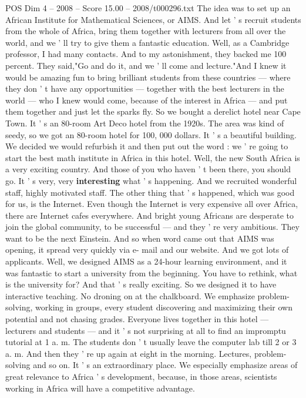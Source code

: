 \begin{textsample}{POS Dim 4 – 2008 – Score 15.00 – 2008/t000296.txt}
The idea was to set up an African Institute for Mathematical Sciences, or AIMS.
And let ' s recruit students from the whole of Africa, bring them together with lecturers from all over the world, and we ' ll try to give them a fantastic education.
Well, as a Cambridge professor, I had many contacts.
And to my astonishment, they backed me 100 percent.
They said,"Go and do it, and we ' ll come and lecture."And I knew it would be amazing fun to bring brilliant students from these countries — where they don ' t have any opportunities — together with the best lecturers in the world — who I knew would come, because of the interest in Africa — and put them together and just let the sparks fly.
So we bought a derelict hotel near Cape Town.
It ' s an 80-room Art Deco hotel from the 1920s.
The area was kind of seedy, so we got an 80-room hotel for 100, 000 dollars.
It ' s a beautiful building.
We decided we would refurbish it and then put out the word : we ' re going to start the best math institute in Africa in this hotel.
Well, the new South Africa is a very exciting country.
And those of you who haven ' t been there, you should go.
It ' s very, very \textbf{interesting} what ' s happening.
And we recruited wonderful staff, highly motivated staff.
The other thing that ' s happened, which was good for us, is the Internet.
Even though the Internet is very expensive all over Africa, there are Internet cafes everywhere.
And bright young Africans are desperate to join the global community, to be successful — and they ' re very ambitious.
They want to be the next Einstein.
And so when word came out that AIMS was opening, it spread very quickly via e- mail and our website.
And we got lots of applicants.
Well, we designed AIMS as a 24-hour learning environment, and it was fantastic to start a university from the beginning.
You have to rethink, what is the university for?
And that ' s really exciting.
So we designed it to have interactive teaching.
No droning on at the chalkboard.
We emphasize problem-solving, working in groups, every student discovering and maximizing their own potential and not chasing grades.
Everyone lives together in this hotel — lecturers and students — and it ' s not surprising at all to find an impromptu tutorial at 1 a. m.
The students don ' t usually leave the computer lab till 2 or 3 a. m.
And then they ' re up again at eight in the morning.
Lectures, problem-solving and so on.
It ' s an extraordinary place.
We especially emphasize areas of great relevance to Africa ' s development, because, in those areas, scientists working in Africa will have a competitive advantage.

\end{textsample}
